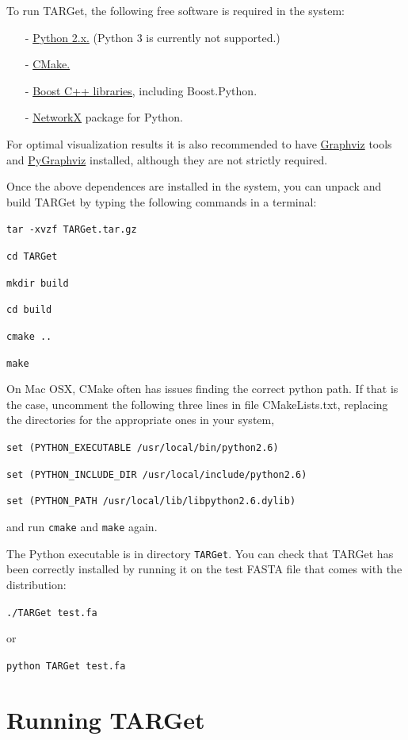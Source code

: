\documentclass[12pt]{article}
\begin{document}
To run TARGet, the following free software is required in the system:
\begin{itemize}
\item[-] \href{https://www.python.org/}{Python 2.x.} (Python 3 is currently not supported.)
\item[-] \href{http://www.cmake.org/}{CMake.}
\item[-] \href{http://www.boost.org/}{Boost C++ libraries,} including Boost.Python.
\item[-] \href{https://networkx.github.io/}{NetworkX} package for Python.
\end{itemize}

\noindent For optimal visualization results it is also recommended to have \href{http://www.graphviz.org/}{Graphviz} tools and \href{http://pygraphviz.github.io/}{PyGraphviz} installed, although they are not strictly required.

Once the above dependences are installed in the system, you can unpack and build TARGet by typing the following commands in a terminal:

\texttt{tar -xvzf TARGet.tar.gz}

\texttt{cd TARGet}

\texttt{mkdir build}

\texttt{cd build}

\texttt{cmake ..}

\texttt{make}

\noindent On Mac OSX, CMake often has issues finding the correct python path. 
If that is the case, uncomment the following three lines in file 
CMakeLists.txt, replacing the directories for the appropriate ones 
in your system,

\texttt{set (PYTHON\_EXECUTABLE /usr/local/bin/python2.6)}

\texttt{set (PYTHON\_INCLUDE\_DIR /usr/local/include/python2.6)}

\texttt{set (PYTHON\_PATH /usr/local/lib/libpython2.6.dylib)}

\noindent and run \texttt{cmake} and \texttt{make} again.

The Python executable is in directory \texttt{TARGet}. You can check that TARGet has been correctly installed by running it on the test FASTA file that comes with the distribution:

\texttt{./TARGet test.fa}

\noindent or

\texttt{python TARGet test.fa}

\section{Running TARGet}
\end{document}
